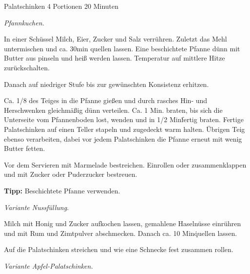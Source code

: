 \begin{recipe}{Palatschinken} {4 Portionen} {20 Minuten}

  \freeform
  \textit{Pfannkuchen.}


  In einer Schüssel Milch, Eier, Zucker und Salz verrühren.
  Zuletzt das Mehl untermischen und ca. 30min quellen lassen.
  Eine beschichtete Pfanne dünn mit Butter aus pinseln und heiß werden lassen.
  Temperatur auf mittlere Hitze zurückschalten.

  \newstep
  Danach auf niedriger Stufe bis zur gewünschten Konsistenz erhitzen.

  \newstep
  Ca. 1/8 des Teiges in die Pfanne gießen und durch rasches Hin- und Herschwenken gleichmäßig dünn verteilen.
  Ca. 1 Min. braten, bis sich die Unterseite vom Pfannenboden lost, wenden und in 1/2 Min\. fertig braten.
  Fertige Palatschinken auf einen Teller stapeln und zugedeckt warm halten.
  Übrigen Teig ebenso verarbeiten, dabei vor jedem Palatschinken die Pfanne erneut mit wenig Butter fetten.

  \newstep
  Vor dem Servieren mit Marmelade bestreichen.
  Einrollen oder zusammenklappen und mit Zucker oder Puderzucker bestreuen.

  \freeform
  \hrulefill

  \freeform
  \textbf{Tipp:}
  Beschichtete Pfanne verwenden.

  \newpage

  \freeform
  \textit{Variante Nussfüllung.}


  Milch mit Honig und Zucker aufkochen lassen, gemahlene Haselnüsse einrühren und mit Rum und Zimtpulver abschmecken.
  Danach ca. 10 Min\. quellen lassen.

  \newstep
  Auf die Palatschinken streichen und wie eine Schnecke fest zusammen rollen.

  \freeform
  \hrulefill

  \freeform
  \textit{Variante Apfel-Palatschinken.}



\end{recipe}
